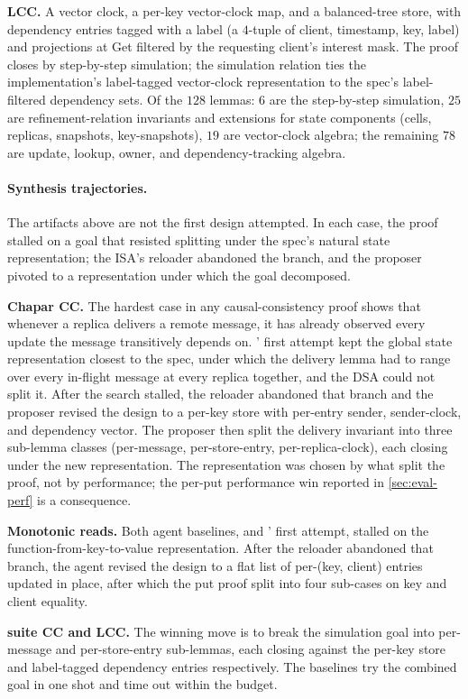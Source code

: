 \textbf{LCC.} A vector clock, a per-key vector-clock map, and a balanced-tree store, with dependency entries tagged with a label (a $4$-tuple of client, timestamp, key, label) and projections at Get filtered by the requesting client's interest mask. The proof closes by step-by-step simulation; the simulation relation ties the implementation's label-tagged vector-clock representation to the spec's label-filtered dependency sets. Of the $128$ lemmas: $6$ are the step-by-step simulation, $25$ are refinement-relation invariants and extensions for state components (cells, replicas, snapshots, key-snapshots), $19$ are vector-clock algebra; the remaining $78$ are update, lookup, owner, and dependency-tracking algebra.

\paragraph{Synthesis trajectories.}
The artifacts above are not the first design \sys{} attempted. In each case, the proof stalled on a goal that resisted splitting under the spec's natural state representation; the ISA's reloader abandoned the branch, and the proposer pivoted to a representation under which the goal decomposed.

\textbf{Chapar CC.} The hardest case in any causal-consistency proof shows that whenever a replica delivers a remote message, it has already observed every update the message transitively depends on. \sys{}' first attempt kept the global state representation closest to the spec, under which the delivery lemma had to range over every in-flight message at every replica together, and the DSA could not split it. After the search stalled, the reloader abandoned that branch and the proposer revised the design to a per-key store with per-entry sender, sender-clock, and dependency vector. The proposer then split the delivery invariant into three sub-lemma classes (per-message, per-store-entry, per-replica-clock), each closing under the new representation. The representation was chosen by what split the proof, not by performance; the per-put performance win reported in \cref{sec:eval-perf} is a consequence.

\textbf{Monotonic reads.} Both agent baselines, and \sys{}' first attempt, stalled on the function-from-key-to-value representation. After the reloader abandoned that branch, the agent revised the design to a flat list of per-(key, client) entries updated in place, after which the put proof split into four sub-cases on key and client equality.

\textbf{\sys{} suite CC and LCC.} The winning move is to break the simulation goal into per-message and per-store-entry sub-lemmas, each closing against the per-key store and label-tagged dependency entries respectively. The baselines try the combined goal in one shot and time out within the budget.
